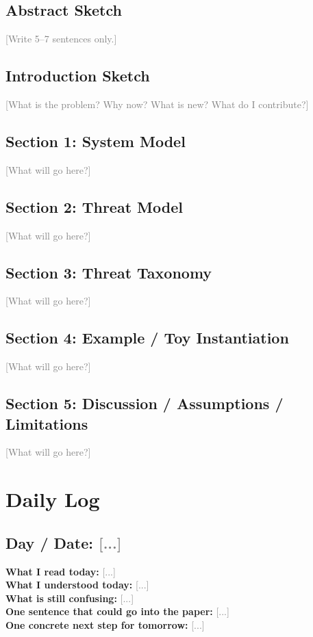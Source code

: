 \documentclass[11pt]{article}
\newcommand{\fillin}[1]{\textcolor{gray}{[#1]}}
\begin{document}
\subsection{Abstract Sketch}
\fillin{Write 5--7 sentences only.}

\subsection{Introduction Sketch}
\fillin{What is the problem? Why now? What is new? What do I contribute?}

\subsection{Section 1: System Model}
\fillin{What will go here?}

\subsection{Section 2: Threat Model}
\fillin{What will go here?}

\subsection{Section 3: Threat Taxonomy}
\fillin{What will go here?}

\subsection{Section 4: Example / Toy Instantiation}
\fillin{What will go here?}

\subsection{Section 5: Discussion / Assumptions / Limitations}
\fillin{What will go here?}

\section{Daily Log}

\subsection*{Day / Date: \fillin{...}}
\textbf{What I read today:} \fillin{...} \\
\textbf{What I understood today:} \fillin{...} \\
\textbf{What is still confusing:} \fillin{...} \\
\textbf{One sentence that could go into the paper:} \fillin{...} \\
\textbf{One concrete next step for tomorrow:} \fillin{...}
\end{document}
